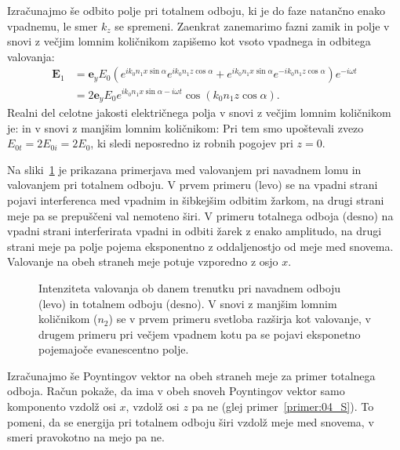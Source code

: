 Izračunajmo še odbito polje pri totalnem odboju, ki je  do faze natančno 
enako vpadnemu, le smer $k_z$ se spremeni. Zaenkrat zanemarimo fazni zamik
in polje v snovi z večjim lomnim količnikom zapišemo kot vsoto vpadnega
in odbitega valovanja:
\begin{align}
\mathbf{E}_1 &= \mathbf{e}_{y} E_{0} \left(
e^{ik_0n_1x\sin \alpha}e^{ik_0n_1z\cos \alpha}+
e^{ik_0n_1x\sin \alpha}e^{-ik_0n_1z\cos \alpha }\right) e^{-i \omega t} \nonumber\\
&= 2\mathbf{e}_{y} E_{0} e^{ik_0n_1x\sin \alpha -i\omega t} 
\cos \left(k_0 n_1z\cos \alpha \right).
 \label{eq:04_65}
\end{align}
Realni del celotne jakosti električnega polja v snovi z večjim lomnim 
količnikom je:
in v snovi z manjšim lomnim količnikom:
Pri tem smo upoštevali zvezo $E_{0t} = 2E_{0i} = 2E_0$, ki sledi neposredno iz 
robnih pogojev pri $z=0$.

Na sliki~\ref{fig:04_simulacija} je prikazana primerjava med valovanjem
pri navadnem lomu in valovanjem pri totalnem odboju. V prvem primeru (levo) se
na vpadni strani pojavi interferenca med
vpadnim in šibkejšim odbitim žarkom, na drugi strani meje pa se prepuščeni val nemoteno
širi. V primeru totalnega odboja (desno) na vpadni strani interferirata 
vpadni in odbiti žarek z enako amplitudo, na drugi strani meje pa polje pojema 
eksponentno z oddaljenostjo od meje med snovema. Valovanje na obeh straneh meje
potuje vzporedno z osjo $x$. 
\begin{figure}[ht]
\centering
\def\svgwidth{140truemm} 

\caption{Intenziteta valovanja ob 
danem trenutku pri navadnem odboju (levo) in totalnem odboju (desno).
V snovi z manjšim lomnim količnikom ($n_2$) se v prvem primeru svetloba razširja
kot valovanje, v drugem primeru pri večjem vpadnem kotu pa se pojavi eksponetno pojemajoče evanescentno
polje.}
\label{fig:04_simulacija}
\end{figure}

Izračunajmo še Poyntingov vektor na obeh straneh meje za primer totalnega odboja. 
Račun pokaže, da ima v obeh snoveh Poyntingov vektor samo komponento vzdolž osi $x$,
vzdolž osi $z$ pa ne (glej primer~\ref{primer:04_S}). To pomeni, da se energija pri totalnem odboju širi 
vzdolž meje med snovema, v smeri pravokotno na mejo pa ne.  

